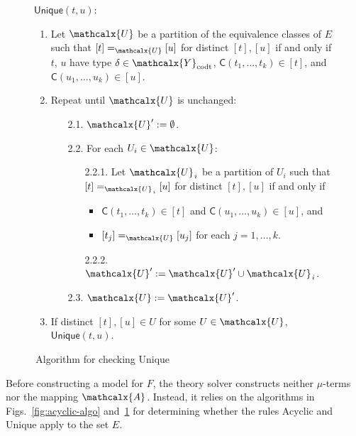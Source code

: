 \documentclass[smallcondensed,draft]{svjour3}
\newcommand\const[1]{\textsf{#1}}
\newcommand{\Ec}{E}
\newcommand{\rn}[1]{\textsf{#1}}
\newcommand{\ec}[1]{[#1]}
\newcommand{\Val}{\mathcalx{A}\vvthinspace}
\newcommand\Types{\mathcalx{Y}}
\newcommand\Codata{\Types_{\mathrm{codt}}}
\newcommand\vvthinspace{\kern+0.041667em}
\newcommand\vthinspace{\kern+0.083333em}
\begin{document}
\begin{figure}[t!]
\normalsize
\centering

\flushleft $\rn{Unique}(t, u)$:

\vspace*{-\topsep}

\begin{enumerate}
\item Let $\mathcalx{U}$ be a partition of the equivalence classes of $\Ec$ such that $\ec{t} =_{\mathcalx{U}} \ec{u}$ for distinct $\ec{t}, \ec{u}$ if and only if
  $t$, $u$ have type $\delta \in \Codata$,
  $\const{C}( t_1, \ldots, t_k ) \in \ec{t}$,
  and $\const{C}( u_1, \ldots, u_k ) \in \ec{u}$.

\item Repeat until $\mathcalx{U}$ is unchanged:
\begin{enumerate}
\item[2.1.] $\mathcalx{U}' := \emptyset$.
\item[2.2.] For each $U_i \in \mathcalx{U}$:
\begin{itemize}
\item[2.2.1.] Let $\mathcalx{U}_{\vthinspace i}$ be a partition of $U_i$ such that $\ec{t} =_{\mathcalx{U}_{\vthinspace i}} \ec{u}$ for distinct $\ec{t}, \ec{u}$ if and only if
\begin{itemize}
\item $\const{C}( t_1, \ldots, t_k ) \in \ec{t}$ and $\const{C}( u_1, \ldots, u_k ) \in \ec{u}$, and
\item $\ec{t_j} =_{\mathcalx{U}} \ec{u_j}$ for each $j = 1, \ldots, k$.
\end{itemize}
\item[2.2.2.] $\mathcalx{U}' := \mathcalx{U}' \cup \mathcalx{U}_{\vthinspace i}$.
\end{itemize}
\item[2.3.] $\mathcalx{U} := \mathcalx{U}'$.
\end{enumerate}
\item If distinct $\ec{t}, \ec{u} \in U$ for some $U \in \mathcalx{U}$, $\rn{Unique}(t,u)$.
\end{enumerate}
\vspace*{-\topsep}
\caption{\,Algorithm for checking \rn{Unique}}
\label{fig:uniqueness-algo}
\end{figure}

Before constructing a model for $F\!$, the theory solver constructs neither $\mu$-terms nor the mapping $\Val$.
Instead, it relies on the algorithms in Figs.~\ref{fig:acyclic-algo} and~\ref{fig:uniqueness-algo}
for determining whether the rules \rn{Acyclic} and \rn{Unique} apply to the set $\Ec$.
\end{document}
